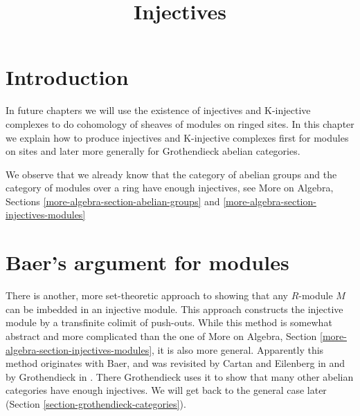 

%


\title{Injectives}


\maketitle

\label{section-phantom}

\tableofcontents

\section{Introduction}
\label{section-introduction}

\noindent
In future chapters we will use the existence of injectives and
K-injective complexes to do cohomology of sheaves of modules on
ringed sites. In this chapter we explain how to produce injectives
and K-injective complexes first for modules on sites and later
more generally for Grothendieck abelian categories.

\medskip\noindent
We observe that we already know that the category of
abelian groups and the category of modules over a ring have
enough injectives, see More on Algebra, Sections
\ref{more-algebra-section-abelian-groups} and
\ref{more-algebra-section-injectives-modules}





\section{Baer's argument for modules}
\label{section-baer}

\noindent
There is another, more set-theoretic approach to showing that any $R$-module
$M$ can be imbedded in an injective module. This approach constructs
the injective module by a transfinite colimit of push-outs. While this
method is somewhat abstract and more complicated than the one of
More on Algebra, Section \ref{more-algebra-section-injectives-modules},
it is also more general. Apparently this method originates with Baer,
and was revisited by Cartan and Eilenberg in
\cite{Cartan-Eilenberg} and by Grothendieck in \cite{Tohoku}.
There Grothendieck uses it to show that
many other abelian categories have enough injectives. We will get back to
the general case later (Section \ref{section-grothendieck-categories}).

